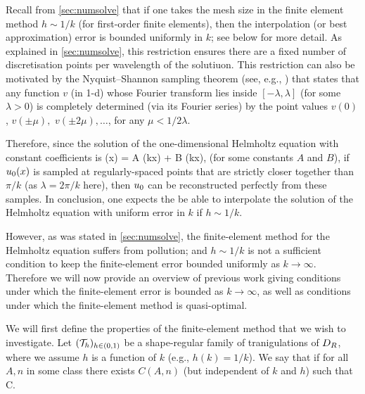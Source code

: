 Recall from \cref{sec:numsolve} that if one takes the mesh size in the finite element method $h \sim 1/k$ (for first-order finite elements), then the interpolation (or best approximation) error is bounded uniformly in $k$; see  below for more detail. As explained in \cref{sec:numsolve}, this restriction ensures there are a fixed number of discretisation points per wavelength of the solutiuon. This restriction can also be motivated by the Nyquist--Shannon sampling theorem (see, e.g., \cite[\S 5.21]{BaNaBe:00}) that states that any function $v$ (in 1-d) whose Fourier transform lies inside $[-\lambda,\lambda]$ (for some $\lambda >0$) is completely determined (via its Fourier series) by the point values $v(0)$, $v(\pm \mu),$ $v(\pm2\mu),  \ldots$, for any $\mu < 1/2\lambda.$

Therefore, since the solution of the one-dimensional Helmholtz equation with constant coefficients is
\beq\label{eq:hh-1d}
\uz(x) = A \sin(kx) + B \cos(kx),
\eeq
(for some constants $A$ and $B$), if $u_{0}(x)$ is sampled at regularly-spaced points that are strictly closer together than $\pi/k$ (as $\lambda = 2\pi/k$ here), then $u_{0}$ can be reconstructed perfectly from these samples. In conclusion, one expects the be able to interpolate the solution of the Helmholtz equation with uniform error in $k$ if $h \sim 1/k.$

However, as was stated in \cref{sec:numsolve}, the finite-element method for the Helmholtz equation suffers from pollution; and $h \sim 1/k$ is not a sufficient condition to keep the finite-element error bounded uniformly as $k\rightarrow \infty.$ Therefore we will now provide an overview of previous work giving conditions under which the finite-element error is bounded as $k\rightarrow \infty$, as well as conditions under which the finite-element method is quasi-optimal.

We will first define the properties of the finite-element method that we wish to investigate.
\bde
Let $(\mathcal T_{h})_{h \in (0,1)}$ be a shape-regular family of tranigulations of $D_{R}$, where we assume $h$ is a function of $k$ (e.g., $h(k) = 1/k$). We say that  if for all $A,n$ in some class there exists $C(A,n)$ (but independent of $k$ and $h$) such that
\beqs
{} \leq C.
\eeqs
{}
\ede

